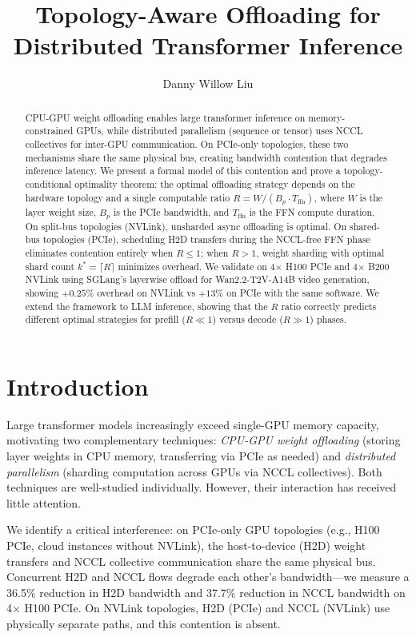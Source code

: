 \documentclass{article}
\title{Topology-Aware Offloading for Distributed Transformer Inference}
\author{Danny Willow Liu}
\date{}
\begin{document}
\maketitle

\begin{abstract}
CPU-GPU weight offloading enables large transformer inference on memory-constrained GPUs, while distributed parallelism (sequence or tensor) uses NCCL collectives for inter-GPU communication. On PCIe-only topologies, these two mechanisms share the same physical bus, creating bandwidth contention that degrades inference latency. We present a formal model of this contention and prove a topology-conditional optimality theorem: the optimal offloading strategy depends on the hardware topology and a single computable ratio $R = W / (B_p \cdot T_{\text{ffn}})$, where $W$ is the layer weight size, $B_p$ is the PCIe bandwidth, and $T_{\text{ffn}}$ is the FFN compute duration. On split-bus topologies (NVLink), unsharded async offloading is optimal. On shared-bus topologies (PCIe), scheduling H2D transfers during the NCCL-free FFN phase eliminates contention entirely when $R \leq 1$; when $R > 1$, weight sharding with optimal shard count $k^* = \lceil R \rceil$ minimizes overhead. We validate on 4$\times$ H100 PCIe and 4$\times$ B200 NVLink using SGLang's layerwise offload for Wan2.2-T2V-A14B video generation, showing $+0.25\%$ overhead on NVLink vs $+13\%$ on PCIe with the same software. We extend the framework to LLM inference, showing that the $R$ ratio correctly predicts different optimal strategies for prefill ($R \ll 1$) versus decode ($R \gg 1$) phases.
\end{abstract}

\section{Introduction}

Large transformer models increasingly exceed single-GPU memory capacity, motivating two complementary techniques: \emph{CPU-GPU weight offloading} (storing layer weights in CPU memory, transferring via PCIe as needed) and \emph{distributed parallelism} (sharding computation across GPUs via NCCL collectives). Both techniques are well-studied individually. However, their interaction has received little attention.

We identify a critical interference: on PCIe-only GPU topologies (e.g., H100 PCIe, cloud instances without NVLink), the host-to-device (H2D) weight transfers and NCCL collective communication share the same physical bus. Concurrent H2D and NCCL flows degrade each other's bandwidth---we measure a 36.5\% reduction in H2D bandwidth and 37.7\% reduction in NCCL bandwidth on 4$\times$ H100 PCIe. On NVLink topologies, H2D (PCIe) and NCCL (NVLink) use physically separate paths, and this contention is absent.
\end{document}
